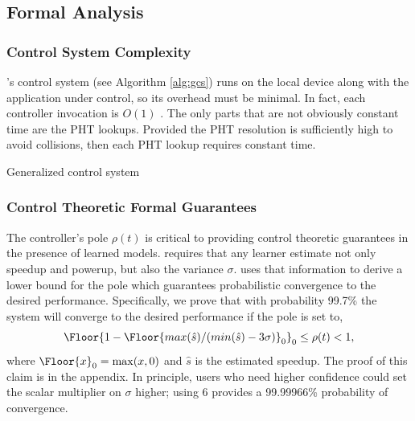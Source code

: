 \subsection{Formal Analysis}
\subsubsection{Control System Complexity}

\SYSTEM{}'s control system (see Algorithm \ref{alg:gcs}) runs on the
local device along with the application under control, so its overhead
must be minimal.  In fact, each controller invocation is $O(1)$ .  The
only parts that are not obviously constant time are the PHT lookups.
Provided the PHT resolution is sufficiently high to avoid collisions,
then each PHT lookup requires constant time.
\begin{algorithm}[t]
\caption{Generalized control system}
\label{alg:gcs}
\end{algorithm}

\subsubsection{Control Theoretic Formal Guarantees}
\label{sec:guarantees}
The controller's pole $\rho(t)$ is critical to providing control
theoretic guarantees in the presence of learned models.  \SYSTEM{}
requires that any learner estimate not only speedup and powerup, but
also the variance $\sigma$.  \SYSTEM{} uses that information to derive
a lower bound for the pole which guarantees probabilistic convergence
to the desired performance. Specifically, we prove that with
probability 99.7\% the system will converge to the desired performance
if the pole is set to,
$$\Floor{1- \Floor{max(\hat{s})/(min(\hat{s}) - 3\sigma)}_0}_0 \leq \rho(t)
< 1,$$ where $\Floor{x}_0 = \max(x,0)$ and $\hat{s}$ is the estimated
speedup. The proof of this claim is in the appendix. In principle,
users who need higher confidence could set the scalar multiplier on
$\sigma$ higher; \eg{} using $6$ provides a 99.99966\% probability of
convergence.


